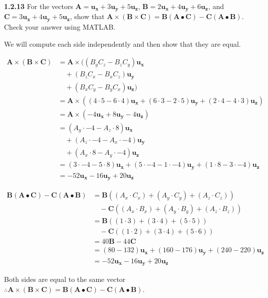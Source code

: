 \documentclass{article}
\begin{document}
\textbf{1.2.13} For the vectors $\mathbf{A} = \mathbf{u_x} + 3\mathbf{u_y} + 5\mathbf{u_z}$, $\mathbf{B} = 2\mathbf{u_x}
	+ 4\mathbf{u_y} + 6\mathbf{u_z}$, and $\mathbf{C} = 3\mathbf{u_x} + 4\mathbf{u_y} + 5\mathbf{u_z}$, show that
$\mathbf{A} \times (\mathbf{B} \times \mathbf{C}) = \mathbf{B} (\mathbf{A} \bullet \mathbf{C}) - \mathbf{C}
	(\mathbf{A} \bullet \mathbf{B})$. Check your answer using MATLAB.\@

\vspace{24pt}

We will compute each side independently and then show that they are equal.

\begin{equation*}
	\begin{split}
		\mathbf{A} \times (\mathbf{B} \times \mathbf{C}) & = \mathbf{A} \times ((B_y C_z - B_z C_y)\mathbf{u_x} \\
		& \quad + (B_z C_x - B_x C_z)\mathbf{u_y} \\
		& \quad + (B_x C_y - B_y C_x)\mathbf{u_z}) \\
		& = \mathbf{A} \times \left( (4 \cdot 5 - 6 \cdot 4)\mathbf{u_x} + (6 \cdot 3 - 2 \cdot 5)\mathbf{u_y} + (2 \cdot 4 - 4 \cdot 3)\mathbf{u_z} \right) \\
		& = \mathbf{A} \times (-4\mathbf{u_x} + 8\mathbf{u_y} - 4\mathbf{u_z}) \\
		& = (A_y \cdot -4 - A_z \cdot 8)\mathbf{u_x} \\
		& \quad + (A_z \cdot -4 - A_x \cdot -4)\mathbf{u_y} \\
		& \quad + (A_x \cdot 8 - A_y \cdot -4)\mathbf{u_z} \\
		& = (3 \cdot -4 - 5 \cdot 8)\mathbf{u_x} + (5 \cdot -4 - 1 \cdot -4)\mathbf{u_y} + (1 \cdot 8 - 3 \cdot -4)\mathbf{u_z} \\
		& = -52\mathbf{u_x} - 16\mathbf{u_y} + 20\mathbf{u_z}
	\end{split}
\end{equation*}

\begin{equation*}
	\begin{split}
		\mathbf{B} (\mathbf{A} \bullet \mathbf{C}) - \mathbf{C} (\mathbf{A} \bullet \mathbf{B}) & = \mathbf{B} ((A_x \cdot C_x) + (A_y \cdot C_y) + (A_z \cdot C_z)) \\
		& \quad - \mathbf{C} ((A_x \cdot B_x) + (A_y \cdot B_y) + (A_z \cdot B_z)) \\
		& = \mathbf{B} ((1 \cdot 3) + (3 \cdot 4) + (5 \cdot 5)) \\
		& \quad - \mathbf{C} ((1 \cdot 2) + (3 \cdot 4) + (5 \cdot 6)) \\
		& = 40 \mathbf{B} - 44 \mathbf{C} \\
		& = (80 - 132)\mathbf{u_x} + (160 - 176)\mathbf{u_y} + (240 - 220)\mathbf{u_z} \\
		& = -52\mathbf{u_x} - 16\mathbf{u_y} + 20\mathbf{u_z}
	\end{split}
\end{equation*}

Both sides are equal to the same vector $\therefore \mathbf{A} \times (\mathbf{B} \times \mathbf{C}) = \mathbf{B}
	(\mathbf{A} \bullet \mathbf{C}) - \mathbf{C} (\mathbf{A} \bullet \mathbf{B})$.
\end{document}
